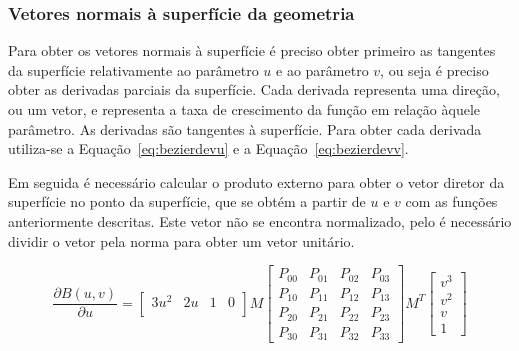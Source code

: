 \subsubsection{Vetores normais à superfície da geometria}


Para obter os vetores normais à superfície é preciso obter primeiro as tangentes
da superfície relativamente ao parâmetro $u$ e ao parâmetro $v$, ou seja
é preciso obter as derivadas parciais da superfície. Cada derivada representa
uma direção, ou um vetor, e representa a taxa de crescimento da função em
relação àquele parâmetro. As derivadas são tangentes à superfície. Para obter
cada derivada utiliza-se a Equação~\ref{eq:bezierdevu}
e a Equação~\ref{eq:bezierdevv}. 

Em seguida é necessário calcular o produto externo para obter o vetor diretor da
superfície no ponto da superfície, que se obtém a partir de $u$ e $v$ com as
funções anteriormente descritas. Este vetor não se encontra normalizado, pelo
é necessário dividir o vetor pela norma para obter um vetor unitário.

\begin{equation}
	\frac{\partial B(u,v)}{\partial u} = \begin{bmatrix}
       3u^{2} & 2u & 1 & 0          \\
		\end{bmatrix}
		M\begin{bmatrix}
		       P_{00} & P_{01} & P_{02} & P_{03}   \\
		       P_{10} & P_{11} & P_{12} & P_{13}   \\
		       P_{20} & P_{21} & P_{22} & P_{23}   \\
		       P_{30} & P_{31} & P_{32} & P_{33}
		     \end{bmatrix}
		M^{T} \begin{bmatrix}
		       v^{3} \\
		       v^{2} \\
		       v \\
		       1
		     \end{bmatrix}
\label{eq:bezierdevu}				 
\end{equation}

